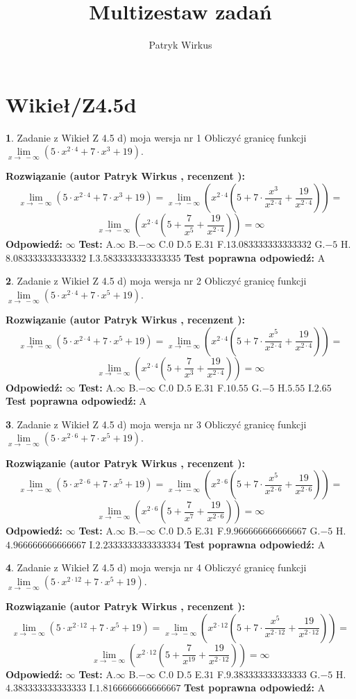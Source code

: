 \documentclass[12pt, a4paper]{article}
\title{Multizestaw zadań}
\author{Patryk Wirkus}
\date{}
\theoremstyle{definition} %
\newtheorem{zad}{}
\newcommand{\kategoria}[1]{\section{#1}}
\newcommand{\zadStart}[1]{\begin{zad}#1\newline}
\newcommand{\zadStop}{\end{zad}}
\newcommand{\rozwStart}[2]{\noindent \textbf{Rozwiązanie (autor #1 , recenzent #2): }\newline}
\newcommand{\rozwStop}{\newline}
\newcommand{\odpStart}{\noindent \textbf{Odpowiedź:}\newline}
\newcommand{\odpStop}{\newline}
\newcommand{\testStart}{\noindent \textbf{Test:}\newline}
\newcommand{\testStop}{\newline}
\newcommand{\kluczStart}{\noindent \textbf{Test poprawna odpowiedź:}\newline}
\newcommand{\kluczStop}{\newline}
\begin{document}
\maketitle

\kategoria{Wikieł/Z4.5d}


\zadStart{Zadanie z Wikieł Z 4.5 d) moja wersja nr 1}
Obliczyć granicę funkcji  $\lim\limits_{x\to\ -\infty}(5 \cdot x^{2\cdot4}+7 \cdot x^{3}+19)$.
\zadStop
\rozwStart{Patryk Wirkus}{}
$$\lim\limits_{x\to\ -\infty}(5 \cdot x^{2\cdot4}+7 \cdot x^{3}+19) = \lim\limits_{x\to\ -\infty}(x^{2\cdot4}(5 +7 \cdot \frac{x^{3}}{x^{2\cdot4}}+\frac{19}{x^{2\cdot4}})) =$$ $$\lim\limits_{x\to\ -\infty}(x^{2\cdot4}(5 +\frac{7}{x^{5}}+\frac{19}{x^{2\cdot4}})) =\infty$$
\rozwStop
\odpStart
$\infty$
\odpStop
\testStart
A.$\infty$ B.$-\infty$ C.$0$ D.$5$ E.$31$
F.$13.083333333333332$ G.$-5$
H.$8.083333333333332$
I.$3.5833333333333335$
\testStop
\kluczStart
A
\kluczStop



\zadStart{Zadanie z Wikieł Z 4.5 d) moja wersja nr 2}
Obliczyć granicę funkcji  $\lim\limits_{x\to\ -\infty}(5 \cdot x^{2\cdot4}+7 \cdot x^{5}+19)$.
\zadStop
\rozwStart{Patryk Wirkus}{}
$$\lim\limits_{x\to\ -\infty}(5 \cdot x^{2\cdot4}+7 \cdot x^{5}+19) = \lim\limits_{x\to\ -\infty}(x^{2\cdot4}(5 +7 \cdot \frac{x^{5}}{x^{2\cdot4}}+\frac{19}{x^{2\cdot4}})) =$$ $$\lim\limits_{x\to\ -\infty}(x^{2\cdot4}(5 +\frac{7}{x^{3}}+\frac{19}{x^{2\cdot4}})) =\infty$$
\rozwStop
\odpStart
$\infty$
\odpStop
\testStart
A.$\infty$ B.$-\infty$ C.$0$ D.$5$ E.$31$
F.$10.55$ G.$-5$
H.$5.55$
I.$2.65$
\testStop
\kluczStart
A
\kluczStop



\zadStart{Zadanie z Wikieł Z 4.5 d) moja wersja nr 3}
Obliczyć granicę funkcji  $\lim\limits_{x\to\ -\infty}(5 \cdot x^{2\cdot6}+7 \cdot x^{5}+19)$.
\zadStop
\rozwStart{Patryk Wirkus}{}
$$\lim\limits_{x\to\ -\infty}(5 \cdot x^{2\cdot6}+7 \cdot x^{5}+19) = \lim\limits_{x\to\ -\infty}(x^{2\cdot6}(5 +7 \cdot \frac{x^{5}}{x^{2\cdot6}}+\frac{19}{x^{2\cdot6}})) =$$ $$\lim\limits_{x\to\ -\infty}(x^{2\cdot6}(5 +\frac{7}{x^{7}}+\frac{19}{x^{2\cdot6}})) =\infty$$
\rozwStop
\odpStart
$\infty$
\odpStop
\testStart
A.$\infty$ B.$-\infty$ C.$0$ D.$5$ E.$31$
F.$9.966666666666667$ G.$-5$
H.$4.966666666666667$
I.$2.2333333333333334$
\testStop
\kluczStart
A
\kluczStop



\zadStart{Zadanie z Wikieł Z 4.5 d) moja wersja nr 4}
Obliczyć granicę funkcji  $\lim\limits_{x\to\ -\infty}(5 \cdot x^{2\cdot12}+7 \cdot x^{5}+19)$.
\zadStop
\rozwStart{Patryk Wirkus}{}
$$\lim\limits_{x\to\ -\infty}(5 \cdot x^{2\cdot12}+7 \cdot x^{5}+19) = \lim\limits_{x\to\ -\infty}(x^{2\cdot12}(5 +7 \cdot \frac{x^{5}}{x^{2\cdot12}}+\frac{19}{x^{2\cdot12}})) =$$ $$\lim\limits_{x\to\ -\infty}(x^{2\cdot12}(5 +\frac{7}{x^{19}}+\frac{19}{x^{2\cdot12}})) =\infty$$
\rozwStop
\odpStart
$\infty$
\odpStop
\testStart
A.$\infty$ B.$-\infty$ C.$0$ D.$5$ E.$31$
F.$9.383333333333333$ G.$-5$
H.$4.383333333333333$
I.$1.8166666666666667$
\testStop
\kluczStart
A
\kluczStop
\end{document}
